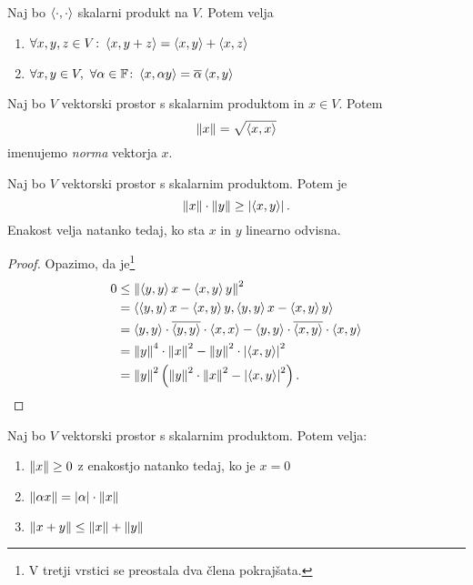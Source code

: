 \documentclass[12pt, a4paper]{article}
\begin{document}
\begin{posledica}
Naj bo $\skl{\cdot,\cdot}$ skalarni produkt na $V$. Potem velja

\begin{enumerate}[label=\roman*)]
\item $\forall x,y,z\in V\colon \skl{x,y+z}=\skl{x,y}+\skl{x,z}$
\item $\forall x,y\in V,~\forall\alpha\in\F\colon \skl{x,\alpha y}=\overline{\alpha}\skl{x,y}$
\end{enumerate}
\end{posledica}

\begin{definicija}
Naj bo $V$ vektorski prostor s skalarnim produktom in $x\in V$. Potem
\[
\norm{x}=\sqrt{\skl{x,x}}
\]
imenujemo \emph{norma} vektorja $x$.
\end{definicija}

\begin{izrek}
Naj bo $V$ vektorski prostor s skalarnim produktom. Potem je
\[
\norm{x}\cdot\norm{y}\geq\abs{\skl{x,y}}.
\]
Enakost velja natanko tedaj, ko sta $x$ in $y$ linearno odvisna.
\end{izrek}

\begin{proof}
Opazimo, da je\footnote{V tretji vrstici se preostala dva člena pokrajšata.}
\begin{align*}
0&\leq\norm{\skl{y,y}x-\skl{x,y}y}^2
\\
&=\skl{\skl{y,y}x-\skl{x,y}y,\skl{y,y}x-\skl{x,y}y}
\\
&=\skl{y,y}\cdot\overline{\skl{y,y}}\cdot\skl{x,x}-\skl{y,y}\cdot\overline{\skl{x,y}}\cdot\skl{x,y}
\\
&=\norm{y}^4\cdot\norm{x}^2-\norm{y}^2\cdot\abs{\skl{x,y}}^2
\\
&=\norm{y}^2\left(\norm{y}^2\cdot\norm{x}^2-\abs{\skl{x,y}}^2\right).\qedhere
\end{align*}
\end{proof}

\begin{trditev}\label{trd:norma}
Naj bo $V$ vektorski prostor s skalarnim produktom. Potem velja:

\begin{enumerate}[label=\roman*)]
\item $\norm{x}\geq 0$ z enakostjo natanko tedaj, ko je $x=0$
\item $\norm{\alpha x}=\abs{\alpha}\cdot\norm{x}$
\item $\norm{x+y}\leq\norm{x}+\norm{y}$
\end{enumerate}
\end{trditev}
\end{document}
